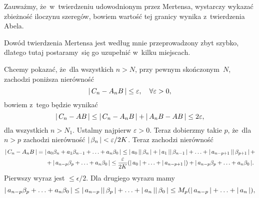 \documentclass[a4paper,11pt]{article}
\begin{document}
\vspace{\spaceFour}



\start {} Zauważmy, że~w~twierdzeniu udowodnionym przez
Mertensa, wystarczy wykazać zbieżność iloczynu szeregów, bowiem
wartość tej granicy wynika z~twierdzenia Abela.

\vspace{\spaceFour}



\start {} Dowód twierdzenia Mertensa jest według mnie
przeprowadzony zbyt szybko, dlatego tutaj postaramy~się go uzupełnić
w~kilku miejscach.

Chcemy pokazać, że~dla wszystkich $n > N$, przy pewnym skończonym~$N$,
zachodzi poniższa nierówność
\begin{equation}
  \label{eq:Leja-14}
    |\, {  C_{ n } - A_{ n } B  } \,| \leq \varepsilon, \quad \forall \varepsilon > 0,
\end{equation}
bowiem z~tego będzie wynikać
\begin{equation}
  \label{eq:Leja-15}
  |\, {  C_{ n } - AB  } \,|
  \leq |\, {  C_{ n } - A_{ n } B  } \,| + |\, {  A_{ n } B - AB  } \,| \leq 2 \varepsilon,
\end{equation}
dla wszystkich $n > N_{ 1 }$. Ustalmy najpierw $\varepsilon > 0$. Teraz
dobierzmy takie $p$, że~dla $n > p$ zachodzi nierówność
$|\, {  \beta_{ n }  } \,| < \varepsilon / 2K$. Teraz zachodzi nierówność
\begin{equation}
  \label{eq:Leja-16}
  \begin{split}
    |\, {  C_{ n } - A_{ n } B  } \,|
    &=
      |\, {  a_{ 0 } \beta_{ n } + a_{ 1 } \beta_{ n - 1 } + \ldots + a_{ n } \beta_{ 0 }  } \,|
      \leq
      |\, {  a_{ 0 }  } \,| |\, {  \beta_{ n }  } \,|
      + |\, {  a_{ 1 }  } \,| |\, {  \beta_{ n - 1 }  } \,| + \ldots
      + |\, {  a_{ n - p + 1 }  } \,| |\, {  \beta_{ p + 1 }  } \,| \, + \\
    &\hspace{1.5em} + |\, {  a_{ n - p } \beta_{ p } + \ldots + a_{ n } \beta_{ 0 }  } \,|
      \leq
      \frac{ \varepsilon }{ 2K }
      ( |\, {  a_{ 0 }  } \,| + \ldots + |\, {  a_{ n - p + 1 }  } \,| )
      + |\, {  a_{ n - p } \beta_{ p } + \ldots + a_{ n } \beta_{ 0 }  } \,|.
  \end{split}
\end{equation}
Pierwszy wyraz jest $\leq \epsilon / 2$. Dla drugiego wyrazu mamy
\begin{equation}
  \label{eq:Leja-17}
  |\, {  a_{ n - p } \beta_{ p } + \ldots + a_{ n } \beta_{ 0 }  } \,|
  \leq
  |\, {  a_{ n - p }  } \,| |\, {  \beta_{ p }  } \,| + \ldots + |\, {  a_{ n }  } \,|
  |\, {  \beta_{ 0 }  } \,|
  \leq M_{ p } ( |\, {  a_{ n - p }  } \,| + \ldots + |\, {  a_{ n }  } \,| ),
\end{equation}
\end{document}
